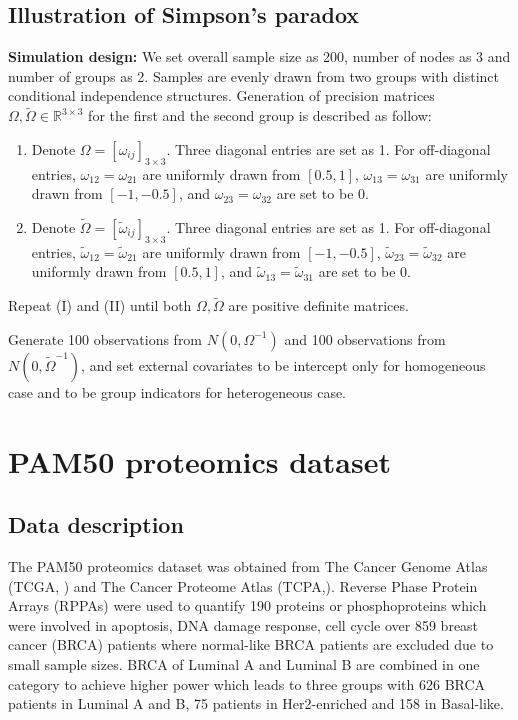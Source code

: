 \documentclass[
]{book}
\begin{document}
\hypertarget{simpson}{%
\section{Illustration of Simpson's paradox}\label{simpson}}

\textbf{Simulation design:}
We set overall sample size as 200, number of nodes as 3 and number of groups as 2. Samples are evenly drawn from two groups with distinct conditional independence structures. Generation of precision matrices \(\Omega,\tilde{\Omega} \in \mathbb{R}^{3 \times3}\) for the first and the second group is described as follow:

\begin{enumerate}
\def\labelenumi{(\Roman{enumi})}
\item
  Denote \(\Omega = [\omega_{ij}]_{3 \times 3}\). Three diagonal entries are set as 1. For off-diagonal entries, \(\omega_{12} = \omega_{21}\) are uniformly drawn from \([0.5,1]\), \(\omega_{13} = \omega_{31}\) are uniformly drawn from \([-1, -0.5]\), and \(\omega_{23} = \omega_{32}\) are set to be 0.
\item
  Denote \(\tilde \Omega = [\tilde \omega_{ij}]_{3 \times 3}\). Three diagonal entries are set as 1. For off-diagonal entries, \(\tilde \omega_{12} = \tilde \omega_{21}\) are uniformly drawn from \([-1, -0.5]\), \(\tilde \omega_{23} = \tilde \omega_{32}\) are uniformly drawn from \([0.5,1]\), and \(\tilde \omega_{13} = \tilde \omega_{31}\) are set to be 0.
\end{enumerate}

Repeat (I) and (II) until both \(\Omega,\tilde{\Omega}\) are positive definite matrices.

Generate 100 observations from \(N(0, \Omega^{-1})\) and 100 observations from \(N(0, \tilde \Omega^{-1})\), and set external covariates to be intercept only for homogeneous case and to be group indicators for heterogeneous case.

\hypertarget{PAM50}{%
\chapter{PAM50 proteomics dataset}\label{PAM50}}

\hypertarget{PAM50data}{%
\section{Data description}\label{PAM50data}}

The PAM50 \citep{parker2009supervised} proteomics dataset was obtained from The Cancer Genome Atlas (TCGA, \citet{weinstein2013cancer}) and The Cancer Proteome Atlas (TCPA,\citet{li2013tcpa}). Reverse Phase Protein Arrays (RPPAs) were used to quantify 190 proteins or phosphoproteins which were involved in apoptosis, DNA damage response, cell cycle \citep{akbani2014pan} over 859 breast cancer (BRCA) patients where normal-like BRCA patients are excluded due to small sample sizes. BRCA of Luminal A and Luminal B are combined in one category to achieve higher power which leads to three groups with 626 BRCA patients in Luminal A and B, 75 patients in Her2-enriched and 158 in Basal-like.
\end{document}
